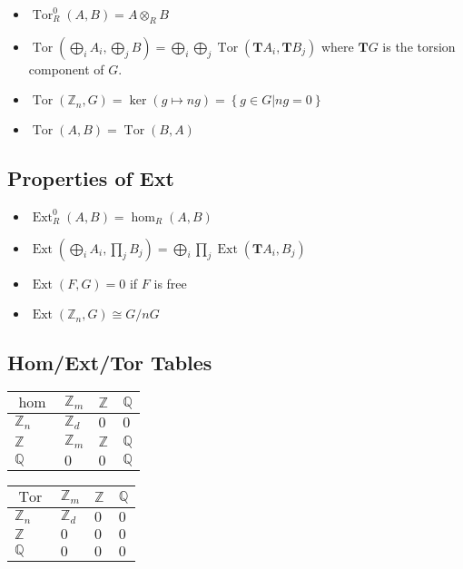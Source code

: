 \begin{itemize}
\tightlist
\item
  \(\operatorname{Tor}_R^0(A, B) = A \otimes_R B\)
\item
  \(\operatorname{Tor}(\bigoplus_i A_i, \bigoplus_j B) = \bigoplus_i \bigoplus_j \operatorname{Tor}(\mathbf{T}A_i, \mathbf{T}B_j)\)
  where \(\mathbf{T}G\) is the torsion component of \(G\).
\item
  \(\operatorname{Tor}({\mathbb{Z}}_n, G) = \ker (g \mapsto ng) = \left\{{g\in G\mathrel{\Big|}ng = 0}\right\}\)
\item
  \(\operatorname{Tor}(A, B) = \operatorname{Tor}(B, A)\)
\end{itemize}

\hypertarget{properties-of-ext}{%
\subsection{Properties of Ext}\label{properties-of-ext}}

\begin{itemize}
\tightlist
\item
  \(\operatorname{Ext}_R^0(A, B) = \hom_R(A, B)\)
\item
  \(\operatorname{Ext}(\bigoplus_i A_i, \prod_j B_j) = \bigoplus_i \prod_j \operatorname{Ext}(\mathbf{T}A_i, B_j)\)
\item
  \(\operatorname{Ext}(F, G) = 0\) if \(F\) is free
\item
  \(\operatorname{Ext}({\mathbb{Z}}_n, G) \cong G/nG\)
\end{itemize}

\hypertarget{homexttor-tables}{%
\subsection{Hom/Ext/Tor Tables}\label{homexttor-tables}}

\begin{longtable}[]{@{}llll@{}}
\toprule
\(\hom\) & \({\mathbb{Z}}_m\) & \({\mathbb{Z}}\) &
\({\mathbb{Q}}\)\tabularnewline
\midrule
\endhead
\({\mathbb{Z}}_n\) & \({\mathbb{Z}}_d\) & \(0\) & \(0\)\tabularnewline
\({\mathbb{Z}}\) & \({\mathbb{Z}}_m\) & \({\mathbb{Z}}\) &
\({\mathbb{Q}}\)\tabularnewline
\({\mathbb{Q}}\) & \(0\) & \(0\) & \({\mathbb{Q}}\)\tabularnewline
\bottomrule
\end{longtable}

\begin{longtable}[]{@{}llll@{}}
\toprule
\(\operatorname{Tor}\) & \({\mathbb{Z}}_m\) & \({\mathbb{Z}}\) &
\({\mathbb{Q}}\)\tabularnewline
\midrule
\endhead
\({\mathbb{Z}}_n\) & \({\mathbb{Z}}_d\) & \(0\) & \(0\)\tabularnewline
\({\mathbb{Z}}\) & \(0\) & \(0\) & \(0\)\tabularnewline
\({\mathbb{Q}}\) & \(0\) & \(0\) & \(0\)\tabularnewline
\bottomrule
\end{longtable}

